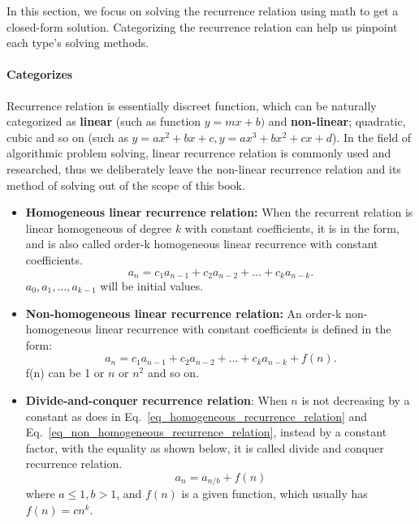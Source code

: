\documentclass[../main.tex]{subfiles}
\begin{document}
 
In this section, we focus on solving the recurrence relation using math to get a closed-form solution.  Categorizing the recurrence relation can help us pinpoint each type's solving methods. 

\paragraph{Categorizes} Recurrence relation is essentially discreet function, which can be naturally categorized as \textbf{linear} (such as function $y=mx+b)$ and \textbf{non-linear}; quadratic, cubic and so on (such as $y=ax^2+bx+c, y=ax^3+bx^2+cx+d$). In the field of algorithmic problem solving, linear recurrence relation is commonly used and researched, thus we deliberately leave the non-linear recurrence relation and its method of solving out of the scope of this book. 
    \begin{itemize}
        \item \textbf{Homogeneous linear recurrence relation:} When the recurrent relation is linear homogeneous of degree $k$ with constant coefficients, it is in the form, and is also called order-k homogeneous linear recurrence with constant coefficients. 
        \begin{equation}
            a_n=c_1a_{n-1} + c_2a_{n-2} + ... + c_k a_{n-k}.
            \label{eq_homogeneous_recurrence_relation}
        \end{equation}
        $a_0, a_1, ..., a_{k-1}$ will be initial values.
 
        \item \textbf{Non-homogeneous linear recurrence relation:} An order-k non-homogeneous linear recurrence with constant coefficients is defined in the form:
                \begin{equation}
            a_n=c_1a_{n-1} + c_2a_{n-2} + ... + c_k a_{n-k}+f(n).
             \label{eq_non_homogeneous_recurrence_relation}
        \end{equation}
        f(n) can be 1 or $n$ or $n^2$ and so on. 
        \item \textbf{Divide-and-conquer recurrence relation}: When $n$ is not decreasing by a constant as does in Eq.~\ref{eq_homogeneous_recurrence_relation} and Eq.~\ref{eq_non_homogeneous_recurrence_relation}, instead by a constant factor, with the equality as shown below, it is called divide and conquer recurrence relation. 
        \begin{equation}
    a_n=a_{n/b}+f(n)
    \label{divide_conquer_eq1}
\end{equation}
where $a\leq 1, b>1$, and $f(n)$ is a given function, which usually has $f(n)= cn^k$. 
        
    \end{itemize}
\end{document}
